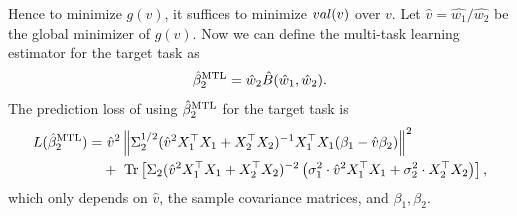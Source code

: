 Hence to minimize $g(v)$, it suffices to minimize $val(v)$ over $v$.
Let $\hat v=\hat{w_1}/\hat{w_2}$ be the global minimizer of $g(v)$.
Now we can define the multi-task learning estimator for the target task as
	\[ \hat{\beta}_2^{\textup{MTL}} = \hat{w}_{2}\hat{B}(\hat{w}_1, \hat{w}_2) .\]
The prediction loss of using $\hat{\beta}_2^{\textup{MTL}}$ for the target task is
\begin{align}
	L(\hat{\beta}_2^{\textup{MTL}}) =&~ \hat{v}^2 \left\| \Sigma_2^{1/2}(\hat{v}^2 X_1^{\top}X_1 + X_2^{\top}X_2)^{-1} X_1^{\top}X_1 (\beta_1 - \hat{v} \beta_2) \right\|^2 \nonumber \\
			&+~  \operatorname{Tr}\left[\Sigma_2(\hat{v}^2 X_1^{\top}X_1 + X_2^{\top}X_2)^{-2}\left(\sigma_1^2 \cdot \hat v^2  X_1^{\top}X_1 + \sigma_2^2  \cdot X_2^{\top}X_2\right) \right], \label{eq_te_mtl_2task}
\end{align}
which only depends on $\hat v$, the sample covariance matrices, and $\beta_1,\beta_2$.
\fi


